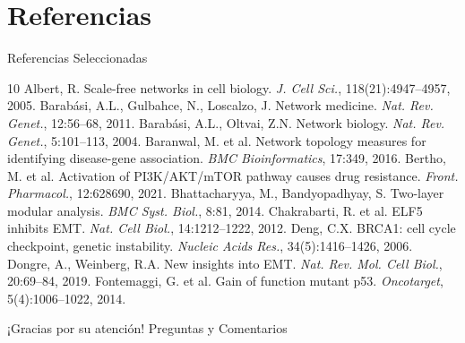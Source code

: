 \documentclass[12pt]{beamer}
\begin{document}
	\section{Referencias}
	\begin{frame}[allowframebreaks]{Referencias Seleccionadas}
		\footnotesize
		\begin{thebibliography}{10}
			 Albert, R. Scale-free networks in cell biology. \textit{J. Cell Sci.}, 118(21):4947–4957, 2005.
			 Barabási, A.L., Gulbahce, N., Loscalzo, J. Network medicine. \textit{Nat. Rev. Genet.}, 12:56–68, 2011.
			 Barabási, A.L., Oltvai, Z.N. Network biology. \textit{Nat. Rev. Genet.}, 5:101–113, 2004.
			 Baranwal, M. et al. Network topology measures for identifying disease-gene association. \textit{BMC Bioinformatics}, 17:349, 2016.
			 Bertho, M. et al. Activation of PI3K/AKT/mTOR pathway causes drug resistance. \textit{Front. Pharmacol.}, 12:628690, 2021.
			 Bhattacharyya, M., Bandyopadhyay, S. Two-layer modular analysis. \textit{BMC Syst. Biol.}, 8:81, 2014.
			 Chakrabarti, R. et al. ELF5 inhibits EMT. \textit{Nat. Cell Biol.}, 14:1212–1222, 2012.
			 Deng, C.X. BRCA1: cell cycle checkpoint, genetic instability. \textit{Nucleic Acids Res.}, 34(5):1416–1426, 2006.
			 Dongre, A., Weinberg, R.A. New insights into EMT. \textit{Nat. Rev. Mol. Cell Biol.}, 20:69–84, 2019.
			 Fontemaggi, G. et al. Gain of function mutant p53. \textit{Oncotarget}, 5(4):1006–1022, 2014.
		\end{thebibliography}
	\end{frame}
	
	\begin{frame}
		\centering
		\Huge ¡Gracias por su atención!
		\vspace{0.5cm}
		\Large Preguntas y Comentarios
	\end{frame}
	
\end{document}

